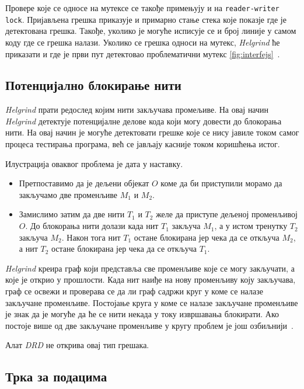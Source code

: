 \documentclass[12pt,oneside]{memoir}
\begin{document}
\indent Провере које се односе на мутексе се такође примењују и на \texttt{reader-writer lock}. Пријављена грешка приказује и примарно стање стека које показје где је детектована грешка. Такође, уколико је могуће исписује се и број линије у самом коду где се грешка налази. Уколико се грешка односи на мутекс, \textit{Helgrind} ће приказати и где је први пут детектовао проблематични мутекс \ref{fig:interfejs}~\cite{helgrindRef}.

\subsection{Потенцијално блокирање нити}

\indent \textit{Helgrind} прати редослед којим нити закључава промељиве. На овај начин \textit{Helgrind} детектује потенцијалне делове кода који могу довести до блокорања нити. На овај начин је могуће детектовати грешке које се нису јавиле током самог процеса тестирања програма, већ се јављају касније током коришћења истог.

\indent Илустрација оваквог проблема је дата у наставку.

\begin{itemize}
  \item Претпоставимо да је дељени објекат $O$ коме да би приступили морамо да закључамо две променљиве $M_1$ и $M_2$.
  \item  Замислимо затим да две нити $T_1$ и $T_2$ желе да приступе дељеној променљивој $O$. До блокорања нити долази када нит $T_1$ закључа $M_1$, а у истом тренутку $T_2$ закључа $M_2$. Након тога нит $T_1$ остане блокирана јер чека да се откључа $M_2$, а нит $T_2$ остане блокирана јер чека да се откључа $T_1$.
\end{itemize}


\indent \textit{Helgrind} креира граф који представља све променљиве које се могу закључати, а које је открио у прошлости. Када нит наиђе на нову променљиву коју закључава, граф се освежи и проверава се да ли граф садржи круг у коме се налазе закључане променљиве. Постојање круга у коме се налазе закључане променљиве је знак да је могуће да ће се нити некада у току извршавања блокирати. Ако постоје више од две закључане променљиве у кругу проблем је још озбиљнији~\cite{helgrindRef}.

\indent  Алат \textit{DRD} не открива овај тип грешака.


\subsection{Трка за подацима}
\end{document}
